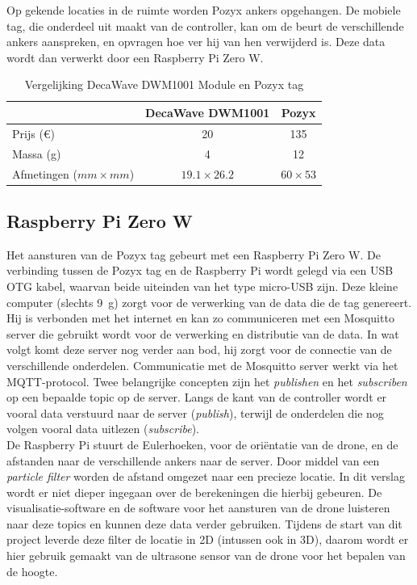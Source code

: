 Op gekende locaties in de ruimte worden Pozyx ankers opgehangen.
De mobiele tag, die onderdeel uit maakt van de controller, kan om de beurt de verschillende ankers aanspreken, en opvragen hoe ver hij van hen verwijderd is.
Deze data wordt dan verwerkt door een Raspberry Pi Zero W.\\

\begin{table}[p]
	\centering
	\begin{tabular}{ | l | c | c | } \hline
		& DecaWave DWM1001 & Pozyx \\
		\hline 
		\hline
		Prijs (\euro{}) & 20 & 135 \\ 
		\hline
		Massa (g) & 4 & 12 \\ 
		\hline
		Afmetingen ($mm \times mm$) & $19.1 \times 26.2$ & $60 \times 53$ \\ 
		\hline
	\end{tabular}
	\caption[Vergelijking DecaWave DWM1001 Module en Pozyx tag]{Vergelijking DecaWave DWM1001 Module en Pozyx tag}
	\label{tab:decavspozyx}
\end{table}

\subsection{Raspberry Pi Zero W} \label{sec:zerow}
Het aansturen van de Pozyx tag gebeurt met een Raspberry Pi Zero W.
De verbinding tussen de Pozyx tag en de Raspberry Pi wordt gelegd via een USB OTG kabel, waarvan beide uiteinden van het type micro-USB zijn.
Deze kleine computer (slechts \SI{9}{\g}) zorgt voor de verwerking van de data die de tag genereert.
Hij is verbonden met het internet en kan zo communiceren met een Mosquitto server die gebruikt wordt voor de verwerking en distributie van de data.
In wat volgt komt deze server nog verder aan bod, hij zorgt voor de connectie van de verschillende onderdelen.
Communicatie met de Mosquitto server werkt via het MQTT-protocol.
Twee belangrijke concepten zijn het \textit{publishen} en het \textit{subscriben} op een bepaalde topic op de server.
Langs de kant van de controller wordt er vooral data verstuurd naar de server (\textit{publish}), terwijl de onderdelen die nog volgen vooral data uitlezen (\textit{subscribe}).\\

De Raspberry Pi stuurt de Eulerhoeken, voor de oriëntatie van de drone, en de afstanden naar de verschillende ankers naar de server. Door middel van een \textit{particle filter} worden de afstand omgezet naar een precieze locatie.
In dit verslag wordt er niet dieper ingegaan over de berekeningen die hierbij gebeuren.
De visualisatie-software en de software voor het aansturen van de drone luisteren naar deze topics en kunnen deze data verder gebruiken.
Tijdens de start van dit project leverde deze filter de locatie in 2D (intussen ook in 3D), daarom wordt er hier gebruik gemaakt van de ultrasone sensor van de drone voor het bepalen van de hoogte.\\

